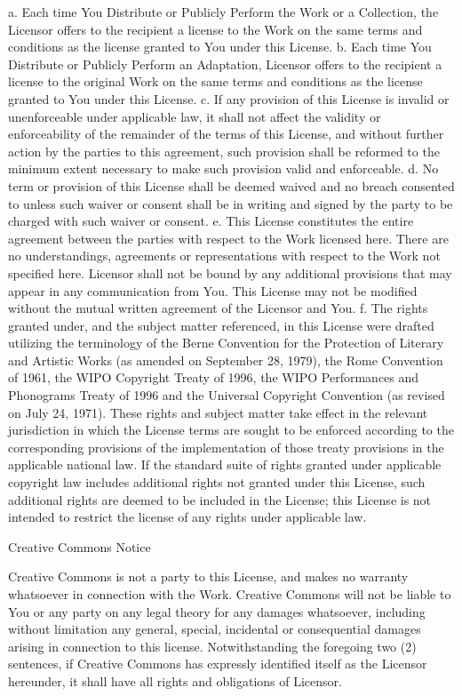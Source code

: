  a. Each time You Distribute or Publicly Perform the Work or a Collection,
    the Licensor offers to the recipient a license to the Work on the same
    terms and conditions as the license granted to You under this License.
 b. Each time You Distribute or Publicly Perform an Adaptation, Licensor
    offers to the recipient a license to the original Work on the same
    terms and conditions as the license granted to You under this License.
 c. If any provision of this License is invalid or unenforceable under
    applicable law, it shall not affect the validity or enforceability of
    the remainder of the terms of this License, and without further action
    by the parties to this agreement, such provision shall be reformed to
    the minimum extent necessary to make such provision valid and
    enforceable.
 d. No term or provision of this License shall be deemed waived and no
    breach consented to unless such waiver or consent shall be in writing
    and signed by the party to be charged with such waiver or consent.
 e. This License constitutes the entire agreement between the parties with
    respect to the Work licensed here. There are no understandings,
    agreements or representations with respect to the Work not specified
    here. Licensor shall not be bound by any additional provisions that
    may appear in any communication from You. This License may not be
    modified without the mutual written agreement of the Licensor and You.
 f. The rights granted under, and the subject matter referenced, in this
    License were drafted utilizing the terminology of the Berne Convention
    for the Protection of Literary and Artistic Works (as amended on
    September 28, 1979), the Rome Convention of 1961, the WIPO Copyright
    Treaty of 1996, the WIPO Performances and Phonograms Treaty of 1996
    and the Universal Copyright Convention (as revised on July 24, 1971).
    These rights and subject matter take effect in the relevant
    jurisdiction in which the License terms are sought to be enforced
    according to the corresponding provisions of the implementation of
    those treaty provisions in the applicable national law. If the
    standard suite of rights granted under applicable copyright law
    includes additional rights not granted under this License, such
    additional rights are deemed to be included in the License; this
    License is not intended to restrict the license of any rights under
    applicable law.


Creative Commons Notice

    Creative Commons is not a party to this License, and makes no warranty
    whatsoever in connection with the Work. Creative Commons will not be
    liable to You or any party on any legal theory for any damages
    whatsoever, including without limitation any general, special,
    incidental or consequential damages arising in connection to this
    license. Notwithstanding the foregoing two (2) sentences, if Creative
    Commons has expressly identified itself as the Licensor hereunder, it
    shall have all rights and obligations of Licensor.

